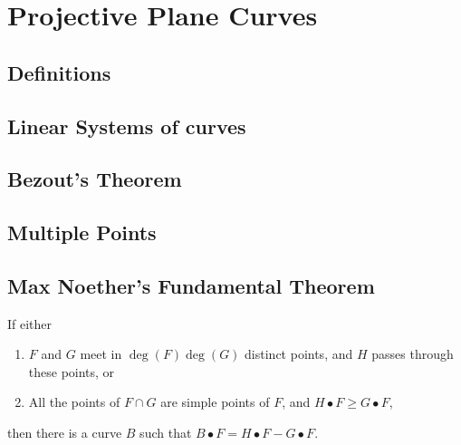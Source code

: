 \chapter{Projective Plane Curves}

\section{Definitions}

\section{Linear Systems of curves}

\section{Bezout's Theorem}

\section{Multiple Points}

\section{Max Noether's Fundamental Theorem}

\begin{corollary}
	If either
	\begin{enumerate}[(1)]
		\item $F$ and $G$ meet in $\deg(F) \deg(G)$ distinct points, and $H$ passes through these points, or
		
		\item All the points of $F \cap G$ are simple points of $F$, and $H \bullet F \geq G \bullet F$,
	\end{enumerate}
	then there is a curve $B$ such that $B \bullet F  = H \bullet F - G \bullet F$.
\end{corollary}

